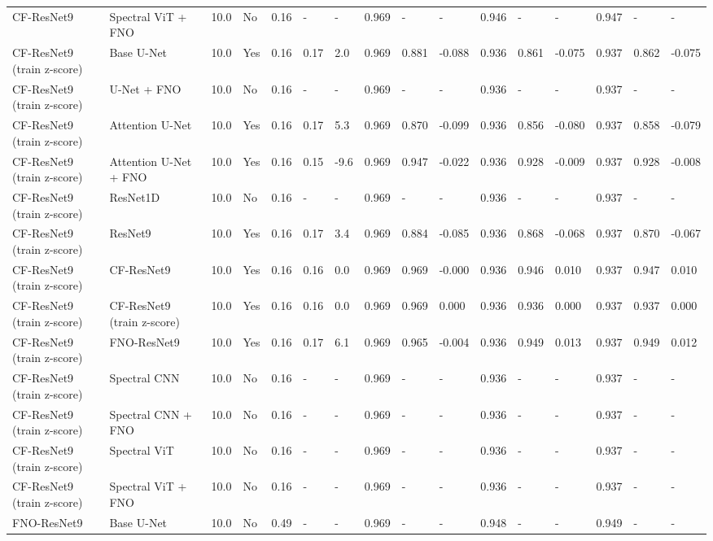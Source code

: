 \begin{longtable}{llllllllllllllll}
CF-ResNet9 & Spectral ViT + FNO & 10.0 & No & 0.16 & - & - & 0.969 & - & - & 0.946 & - & - & 0.947 & - & - \\
CF-ResNet9 (train z-score) & Base U-Net & 10.0 & Yes & 0.16 & 0.17 & 2.0 & 0.969 & 0.881 & -0.088 & 0.936 & 0.861 & -0.075 & 0.937 & 0.862 & -0.075 \\
CF-ResNet9 (train z-score) & U-Net + FNO & 10.0 & No & 0.16 & - & - & 0.969 & - & - & 0.936 & - & - & 0.937 & - & - \\
CF-ResNet9 (train z-score) & Attention U-Net & 10.0 & Yes & 0.16 & 0.17 & 5.3 & 0.969 & 0.870 & -0.099 & 0.936 & 0.856 & -0.080 & 0.937 & 0.858 & -0.079 \\
CF-ResNet9 (train z-score) & Attention U-Net + FNO & 10.0 & Yes & 0.16 & 0.15 & -9.6 & 0.969 & 0.947 & -0.022 & 0.936 & 0.928 & -0.009 & 0.937 & 0.928 & -0.008 \\
CF-ResNet9 (train z-score) & ResNet1D & 10.0 & No & 0.16 & - & - & 0.969 & - & - & 0.936 & - & - & 0.937 & - & - \\
CF-ResNet9 (train z-score) & ResNet9 & 10.0 & Yes & 0.16 & 0.17 & 3.4 & 0.969 & 0.884 & -0.085 & 0.936 & 0.868 & -0.068 & 0.937 & 0.870 & -0.067 \\
CF-ResNet9 (train z-score) & CF-ResNet9 & 10.0 & Yes & 0.16 & 0.16 & 0.0 & 0.969 & 0.969 & -0.000 & 0.936 & 0.946 & 0.010 & 0.937 & 0.947 & 0.010 \\
CF-ResNet9 (train z-score) & CF-ResNet9 (train z-score) & 10.0 & Yes & 0.16 & 0.16 & 0.0 & 0.969 & 0.969 & 0.000 & 0.936 & 0.936 & 0.000 & 0.937 & 0.937 & 0.000 \\
CF-ResNet9 (train z-score) & FNO-ResNet9 & 10.0 & Yes & 0.16 & 0.17 & 6.1 & 0.969 & 0.965 & -0.004 & 0.936 & 0.949 & 0.013 & 0.937 & 0.949 & 0.012 \\
CF-ResNet9 (train z-score) & Spectral CNN & 10.0 & No & 0.16 & - & - & 0.969 & - & - & 0.936 & - & - & 0.937 & - & - \\
CF-ResNet9 (train z-score) & Spectral CNN + FNO & 10.0 & No & 0.16 & - & - & 0.969 & - & - & 0.936 & - & - & 0.937 & - & - \\
CF-ResNet9 (train z-score) & Spectral ViT & 10.0 & No & 0.16 & - & - & 0.969 & - & - & 0.936 & - & - & 0.937 & - & - \\
CF-ResNet9 (train z-score) & Spectral ViT + FNO & 10.0 & No & 0.16 & - & - & 0.969 & - & - & 0.936 & - & - & 0.937 & - & - \\
FNO-ResNet9 & Base U-Net & 10.0 & No & 0.49 & - & - & 0.969 & - & - & 0.948 & - & - & 0.949 & - & - \\

\end{longtable}
